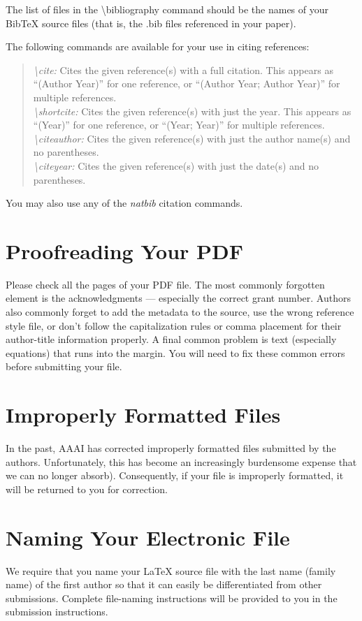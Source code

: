 The list of files in the \textbackslash bibliography command should be the names of your BibTeX source files (that is, the .bib files referenced in your paper).

The following commands are available for your use in citing references:
\begin{quote}
{\em \textbackslash cite:} Cites the given reference(s) with a full citation. This appears as ``(Author Year)'' for one reference, or ``(Author Year; Author Year)'' for multiple references.\smallskip\\
{\em \textbackslash shortcite:} Cites the given reference(s) with just the year. This appears as ``(Year)'' for one reference, or ``(Year; Year)'' for multiple references.\smallskip\\
{\em \textbackslash citeauthor:} Cites the given reference(s) with just the author name(s) and no parentheses.\smallskip\\
{\em \textbackslash citeyear:} Cites the given reference(s) with just the date(s) and no parentheses.
\end{quote}
You may also use any of the \emph{natbib} citation commands.


\section{Proofreading Your PDF}
Please check all the pages of your PDF file. The most commonly forgotten element is the acknowledgments --- especially the correct grant number. Authors also commonly forget to add the metadata to the source, use the wrong reference style file, or don't follow the capitalization rules or comma placement for their author-title information properly. A final common problem is text (especially equations) that runs into the margin. You will need to fix these common errors before submitting your file.

\section{Improperly Formatted Files }
In the past, AAAI has corrected improperly formatted files submitted by the authors. Unfortunately, this has become an increasingly burdensome expense that we can no longer absorb). Consequently, if your file is improperly formatted, it will be returned to you for correction.

\section{Naming Your Electronic File}
We require that you name your \LaTeX{} source file with the last name (family name) of the first author so that it can easily be differentiated from other submissions. Complete file-naming instructions will be provided to you in the submission instructions.

